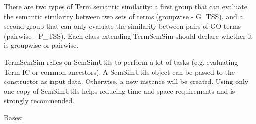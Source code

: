 \documentclass[letterpaper,10pt,english]{sphinxmanual}
\begin{document}
There are two types of Term semantic similarity: a first group that can evaluate the semantic similarity between two sets of terms (groupwise - G\_TSS), and a second group that can only evaluate the similarity between pairs of GO terms (pairwise - P\_TSS). Each class extending TermSemSim should declare whether it is groupwise or pairwise.

TermSemSim relies on SemSimUtils to perform a lot of tasks (e.g. evaluating Term IC or common ancestors).
A SemSimUtils object can be passed to the constructor as input data. Otherwise, a new instance will be created. Using only one copy of SemSimUtils helps reducing time and space requirements and is strongly recommended.

\begin{fulllineitems}
\label{fastsemsim.SemSim:fastsemsim.SemSim.TermSemSim.MissingAcException}
Bases: 

\end{fulllineitems}

\end{document}
